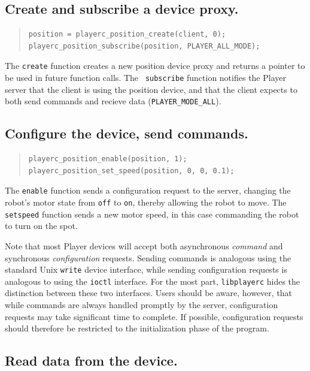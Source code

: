 \documentclass[11pt]{report}
\begin{document}
\subsection*{Create and subscribe a device proxy.}

\begin{quote}\begin{verbatim}
position = playerc_position_create(client, 0);
playerc_position_subscribe(position, PLAYER_ALL_MODE);
\end{verbatim}\end{quote}
The {\tt create} function creates a new position device proxy and
returns a pointer to be used in future function calls.  The {\tt
subscribe} function notifies the Player server that the client is
using the position device, and that the client expects to both send
commands and recieve data ({\tt PLAYER\_MODE\_ALL}).

\subsection*{Configure the device, send commands.}

\begin{quote}\begin{verbatim}
playerc_position_enable(position, 1);
playerc_position_set_speed(position, 0, 0, 0.1);
\end{verbatim}\end{quote}
The {\tt enable} function sends a configuration request to the server,
changing the robot's motor state from {\tt off} to {\tt on}, thereby
allowing the robot to move.  The {\tt setspeed} function sends a new
motor speed, in this case commanding the robot to turn on the spot.

Note that most Player devices will accept both asynchronous {\em
command} and synchronous {\em configuration} requests.  Sending
commands is analogous using the standard Unix {\tt write} device
interface, while sending configuration requests is analogous to using
the {\tt ioctl} interface.  For the most part, {\tt libplayerc} hides
the distinction between these two interfaces.  Users should be aware,
however, that while commands are always handled promptly by the
server, configuration requests may take significant time to complete.
If possible, configuration requests should therefore be restricted to
the initialization phase of the program.

\subsection*{Read data from the device.}
\end{document}
